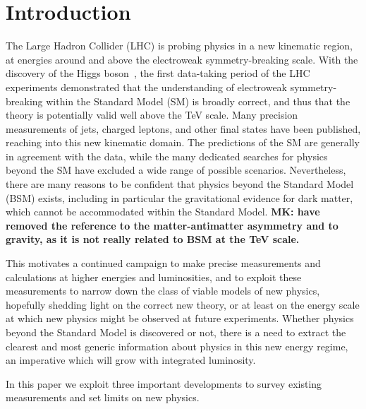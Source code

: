 \documentclass[floatfix]{article}
\begin{document}
\section{Introduction}
\label{sec:intro}
The Large Hadron Collider (LHC) is probing physics in a new kinematic region, at energies around and above the 
electroweak symmetry-breaking scale. With the discovery of the Higgs boson~\cite{Aad:2012tfa,Chatrchyan:2012ufa}, 
the first data-taking period of the LHC experiments demonstrated that the understanding of electroweak symmetry-breaking within
the Standard Model (SM) is broadly correct, and thus that the theory is potentially valid well above the
TeV scale. Many precision measurements of jets, charged leptons, and other final states 
have been published, reaching into this new kinematic domain. The predictions of the SM are 
generally in agreement with the data, while the many dedicated searches for physics beyond the SM
have excluded a wide range of possible scenarios. 
Nevertheless, there are many reasons to be confident that
physics beyond the Standard Model (BSM) exists, including in particular the gravitational evidence for dark matter, which cannot be accommodated within the 
Standard Model. \textbf{MK: have removed the reference to the matter-antimatter asymmetry and to gravity, as it is not really related to BSM at the TeV scale.} 


This motivates a continued campaign to make precise measurements and calculations at higher energies and 
luminosities, and to exploit these measurements to narrow down the class of viable models of new physics, 
hopefully shedding light on the correct new theory, or at least on the energy scale at which
new physics might be observed at future experiments. Whether physics beyond the Standard Model is discovered 
or not, there is a need to extract the clearest and most generic information about physics in this new energy regime,
an imperative which will grow with integrated luminosity. 

In this paper we exploit three important developments to survey existing measurements and set 
limits on new physics. 
\end{document}
